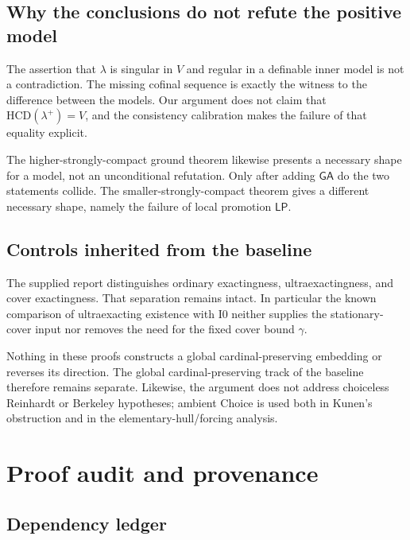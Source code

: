 \documentclass[11pt,letterpaper]{article}
\theoremstyle{definition}
\newcommand{\Izero}{\mathrm{I0}}
\newcommand{\HCD}{\mathrm{HCD}}
\newcommand{\GA}{\mathsf{GA}}
\newcommand{\LP}{\mathsf{LP}}
\numberwithin{equation}{section}
\begin{document}
\subsection{Why the conclusions do not refute the positive model}

The assertion that $\lambda$ is singular in $V$ and regular in a definable inner model is not a contradiction. The missing cofinal sequence is exactly the witness to the difference between the models. Our argument does not claim that $\HCD(\lambda^+)=V$, and the consistency calibration makes the failure of that equality explicit.

The higher-strongly-compact ground theorem likewise presents a necessary shape for a model, not an unconditional refutation. Only after adding $\GA$ do the two statements collide. The smaller-strongly-compact theorem gives a different necessary shape, namely the failure of local promotion $\LP$.

\subsection{Controls inherited from the baseline}

The supplied report distinguishes ordinary exactingness, ultraexactingness, and cover exactingness. That separation remains intact. In particular the known comparison of ultraexacting existence with $\Izero$ \cite{abgl} neither supplies the stationary-cover input nor removes the need for the fixed cover bound $\gamma$.

Nothing in these proofs constructs a global cardinal-preserving embedding or reverses its direction. The global cardinal-preserving track of the baseline therefore remains separate. Likewise, the argument does not address choiceless Reinhardt or Berkeley hypotheses; ambient Choice is used both in Kunen's obstruction and in the elementary-hull/forcing analysis.

\newpage
\section{Proof audit and provenance}\label{sec:audit}

\subsection{Dependency ledger}
\end{document}
